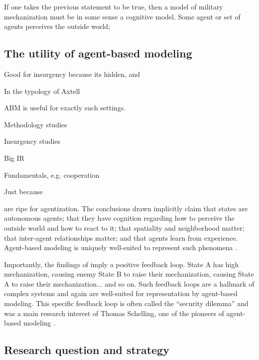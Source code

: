 \documentclass{article}
\begin{document}
If one takes the previous statement to be true, then a model of military mechanization must be in
some sense a cognitive model. Some agent or set of agents perceives the outside world; 

\subsection{The utility of agent-based modeling}

Good for insurgency because its hidden, and 

In the typology of Axtell \citep{axtell2000agents}

ABM is useful for exactly such settings.

Methodology studies
\citep{pepinsky2005agents,de2014agent,
gunitsky2013complexity,bousquet2011beyond,
harrison2012complexity,jervis1998system,modelski1990world,modelski1999long,cederman2001agent}

Insurgency studies
\citep{cioffi2010mason,weidmann2013violence,bhavnani2012modeling,bhavnani2014group}

Big IR \citep{cederman2010growing,earnest2008coordination,masad2016dissertation}

Fundamentals, e.g. cooperation \citep{axelrod1981evolution}

Just because \citep{epstein1996growing}

are ripe for agentization. The
conclusions drawn implicitly claim
that states are autonomous agents; that they have
cognition regarding how to perceive the outside world
and how to react to it; that spatiality and
neighborhood matter; that inter-agent relationships matter; and that
agents learn from experience. Agent-based modeling is uniquely well-suited to
represent such phenomena \citep{gilbert2005simulation,miller2009complex}.

Importantly, the findings of \citet{sechser2010army} imply a positive feedback
loop. State A has high
mechanization, causing enemy State B to raise their mechanization, causing State
A to raise their mechanization... and so on. Such feedback loops are a hallmark
of complex systems and again are well-suited for representation by agent-based
modeling. This specific feedback loop is often called
the ``security dilemma'' and was a main research interest of Thomas Schelling, one of the pioneers
of agent-based modeling \citep{schelling1960strategy,schelling2006micromotives}.

\subsection{Research question and strategy}
\end{document}
